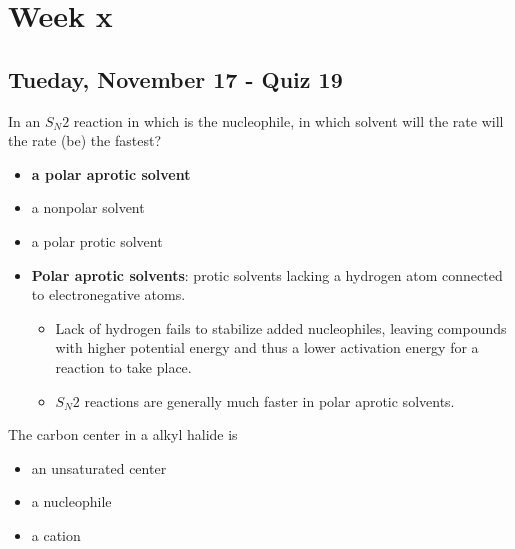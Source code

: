 \documentclass[12pt,a4paper]{article}
\begin{document}
\tableofcontents
\cleardoublepage
\fancyhead{}
\clearpage
\section*{Week x}
{}

\subsection{Tueday, November 17 - Quiz 19}
\begin{enumerate}
    {\color{G-Moon}\item In an \(S_N2\) reaction in which  is the nucleophile, in which solvent will the rate will the rate (be) the fastest?
    \begin{itemize}
        \item {\color{o-Sun}\textbf{a polar aprotic solvent}}
        \item a nonpolar solvent
        \item a polar protic solvent
    \end{itemize}
    }
    \begin{itemize}
        \item \textbf{Polar aprotic solvents}: protic solvents lacking a hydrogen atom connected to electronegative atoms.
        \begin{itemize}
            \item Lack of hydrogen {\color{o-Sun}fails to stabilize added nucleophiles}, leaving compounds with higher potential energy and thus a {\color{o-Sun}lower activation energy} for a reaction to take place.
            \item \(S_N2\) reactions are generally much {\color{o-Sun}faster in polar aprotic solvents}.
        \end{itemize}
    \end{itemize}
    {\color{G-Moon}\item The carbon center in a alkyl halide is
    \begin{itemize}
        \item an unsaturated center
        \item a nucleophile
        \item a cation

\end{itemize}}
\end{enumerate}
\end{document}
